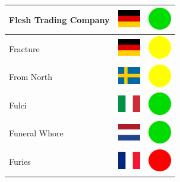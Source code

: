 \documentclass[12pt, a4paper, twoside]{report}
\begin{document}
\begin{center}
\begin{longtable}{|p{5cm}|p{2cm}|p{2cm}|}
 Flesh Trading Company                                      & \includegraphics[width=1cm]{../4x3/de} &   \includegraphics[width=1cm]{../likes/y} \\ \hline
 Fracture                                                   & \includegraphics[width=1cm]{../4x3/de} &   \includegraphics[width=1cm]{../likes/m} \\ \hline
 From North                                                 & \includegraphics[width=1cm]{../4x3/se} &   \includegraphics[width=1cm]{../likes/m} \\ \hline
 Fulci                                                      & \includegraphics[width=1cm]{../4x3/it} &   \includegraphics[width=1cm]{../likes/y} \\ \hline
 Funeral Whore                                              & \includegraphics[width=1cm]{../4x3/nl} &   \includegraphics[width=1cm]{../likes/y} \\ \hline
 Furies                                                     & \includegraphics[width=1cm]{../4x3/fr} &   \includegraphics[width=1cm]{../likes/n} \\ \hline

\end{longtable}
\end{center}
\end{document}
